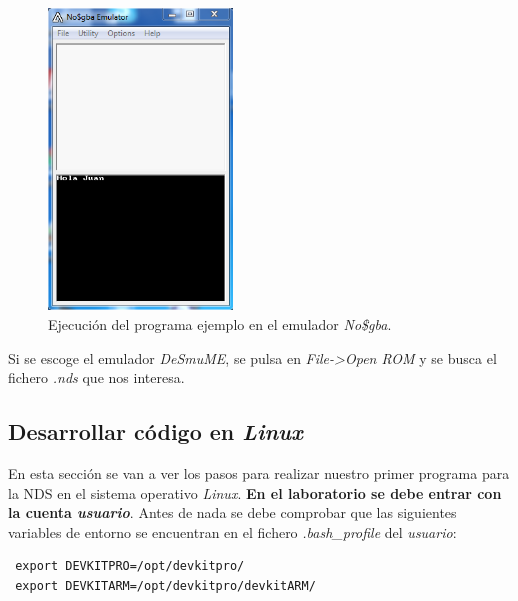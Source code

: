\begin{figure}[h]
\centering
\includegraphics[height=8cm]{./Figuras/C2/c2_eclipse11b.png}
\caption{Ejecución del programa ejemplo en el emulador \textit{No\$gba}.}
\label{fig_c2_eclipse11b}
\end{figure}

Si se escoge el emulador \textit{DeSmuME}, se pulsa en \textit{File->Open ROM} y se busca el fichero \textit{.nds} que nos interesa.


\subsection{Desarrollar código en \textit{Linux}}
\label{sec:programa}

En esta sección se van a ver los pasos para realizar nuestro primer programa para la NDS en el sistema operativo \textit{Linux}. \textbf{En el laboratorio se debe entrar con la cuenta \textit{usuario}}. Antes de nada se debe comprobar que las siguientes variables de entorno se encuentran en el fichero \textit{.bash\_profile} del \textit{usuario}:
\begin{verbatim}
 export DEVKITPRO=/opt/devkitpro/
 export DEVKITARM=/opt/devkitpro/devkitARM/
\end{verbatim}

